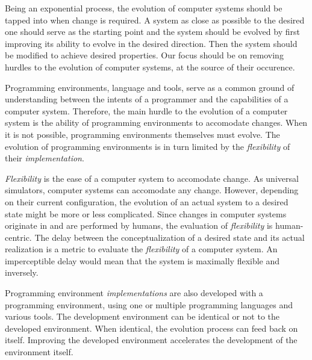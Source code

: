 Being an exponential process, the evolution of computer systems should be
tapped into when change is required. A system as close as possible to the
desired one should serve as the starting point and the system should be evolved
by first improving its ability to evolve in the desired direction.  Then the
system should be modified to achieve desired properties. Our focus should be on
removing hurdles to the evolution of computer systems, at the source of their
occurence.

Programming environments, language and tools, serve as a common ground of
understanding between the intents of a programmer and the capabilities of a
computer system. Therefore, the main hurdle to the evolution of a computer
system is the ability of programming environments to accomodate changes. When
it is not possible, programming environments themselves must evolve. The
evolution of programming environments is in turn limited by the
\textit{flexibility} of their \textit{implementation}. 

\textit{Flexibility} is the ease of a computer system to accomodate change.
As universal simulators, computer systems can accomodate any change. However,
depending on their current configuration, the evolution of an actual system to
a desired state might be more or less complicated.  Since changes in computer
systems originate in and are performed by humans, the evaluation of
\textit{flexibility} is human-centric. The delay between the conceptualization
of a desired state and its actual realization is a metric to evaluate the
\textit{flexibility} of a computer system. An imperceptible delay would mean
that the system is maximally flexible and inversely.

Programming environment \textit{implementations} are also developed with a
programming environment, using one or multiple programming languages and
various tools. The development environment can be identical or not to the
developed environment.  When identical, the evolution process can feed back on
itself. Improving the developed environment accelerates the development of the
environment itself.  

